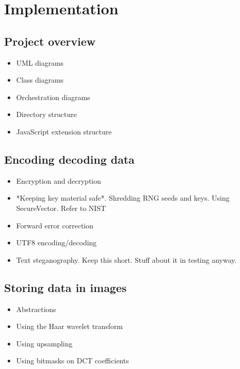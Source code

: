\chapter{Implementation}\label{ch:implementation}

\section{Project overview}
    \begin{itemize}
        \item UML diagrams
        \item Class diagrams
        \item Orchestration diagrams
        \item Directory structure
        \item JavaScript extension structure
    \end{itemize}


\section{Encoding decoding data}
    \begin{itemize}
        \item Encryption and decryption
        \item *Keeping key material safe*. Shredding RNG seeds and keys. Using SecureVector. Refer to NIST
        \item Forward error correction
        \item UTF8 encoding/decoding
        \item Text steganography. Keep this short. Stuff about it in testing anyway.
    \end{itemize}

\section{Storing data in images}
    \begin{itemize}
        \item Abstractions
        \item Using the Haar wavelet transform
        \item Using upsampling
        \item Using bitmasks on DCT coefficients
    \end{itemize}

